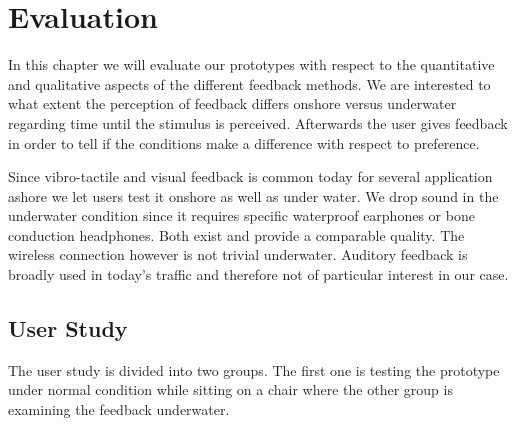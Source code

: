 %

\chapter{Evaluation}
\label{evaluation}

In this chapter we will evaluate our prototypes with respect to the quantitative and qualitative aspects of the different feedback methods. We are interested to what extent the perception of feedback differs onshore versus underwater regarding time until the stimulus is perceived. Afterwards the user gives feedback in order to tell if the conditions make a difference with respect to preference. 


Since vibro-tactile and visual feedback is common today for several application ashore we let users test it onshore as well as under water. We drop sound in the underwater condition since it requires specific waterproof earphones or bone conduction headphones. Both exist and provide a comparable quality. The wireless connection however is not trivial underwater. Auditory feedback is broadly used in today's traffic and therefore not of particular interest in our case. 

\section{User Study}
The user study is divided into two groups. The first one is testing the prototype under normal condition while sitting on a chair where the other group is examining the feedback  underwater. 



